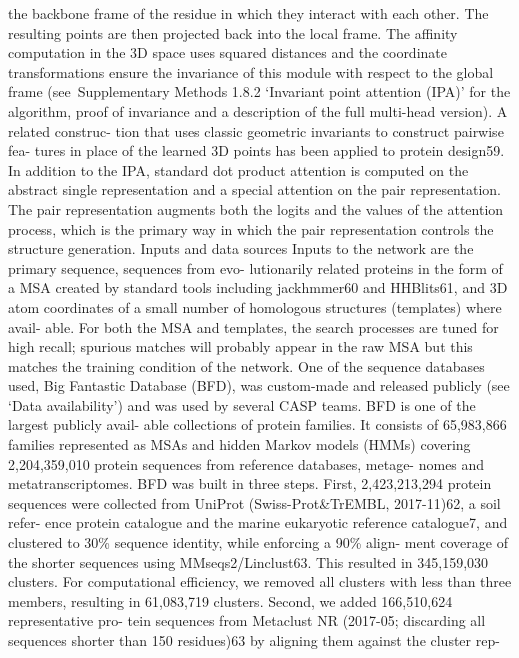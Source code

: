 the backbone frame of the residue in which they interact with each
other. The resulting points are then projected back into the local frame.
The affinity computation in the 3D space uses squared distances and
the coordinate transformations ensure the invariance of this module
with respect to the global frame (see Supplementary Methods 1.8.2
‘Invariant point attention (IPA)’ for the algorithm, proof of invariance
and a description of the full multi-head version). A related construc-
tion that uses classic geometric invariants to construct pairwise fea-
tures in place of the learned 3D points has been applied to protein
design59.
In addition to the IPA, standard dot product attention is computed
on the abstract single representation and a special attention on the pair
representation. The pair representation augments both the logits and
the values of the attention process, which is the primary way in which
the pair representation controls the structure generation.
Inputs and data sources
Inputs to the network are the primary sequence, sequences from evo-
lutionarily related proteins in the form of a MSA created by standard
tools including jackhmmer60 and HHBlits61, and 3D atom coordinates
of a small number of homologous structures (templates) where avail-
able. For both the MSA and templates, the search processes are tuned
for high recall; spurious matches will probably appear in the raw MSA
but this matches the training condition of the network.
One of the sequence databases used, Big Fantastic Database (BFD),
was custom-made and released publicly (see ‘Data availability’) and
was used by several CASP teams. BFD is one of the largest publicly avail-
able collections of protein families. It consists of 65,983,866 families
represented as MSAs and hidden Markov models (HMMs) covering
2,204,359,010 protein sequences from reference databases, metage-
nomes and metatranscriptomes.
BFD was built in three steps. First, 2,423,213,294 protein sequences
were collected from UniProt (Swiss-Prot\&TrEMBL, 2017-11)62, a soil refer-
ence protein catalogue and the marine eukaryotic reference catalogue7,
and clustered to 30\% sequence identity, while enforcing a 90\% align-
ment coverage of the shorter sequences using MMseqs2/Linclust63.
This resulted in 345,159,030 clusters. For computational efficiency,
we removed all clusters with less than three members, resulting in
61,083,719 clusters. Second, we added 166,510,624 representative pro-
tein sequences from Metaclust NR (2017-05; discarding all sequences
shorter than 150 residues)63 by aligning them against the cluster rep-
